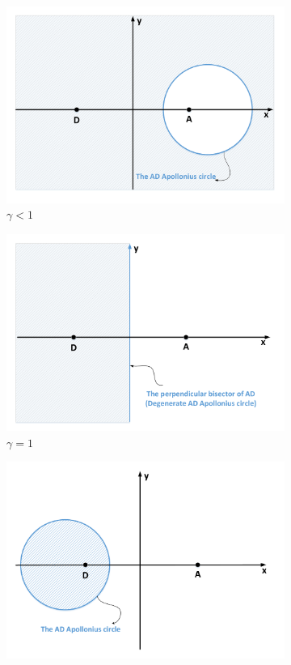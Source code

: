 \documentclass[final,5p,times,twocolumn]{elsarticle}
\begin{document}
\begin{figure}
\centering
\begin{subfigure}[htb]{0.3\textwidth}
\includegraphics[width=\columnwidth]{drawing4_1a.pdf}
\caption {$\gamma<1$}
\label{2_g<1}
\end{subfigure}
\quad
\begin{subfigure}[htb]{0.3\textwidth}
\includegraphics[width=\columnwidth]{drawing4_1b.pdf}
\caption {$\gamma=1$}
\label{2_g=1}
\end{subfigure}
\quad
\begin{subfigure}[htb]{0.3\textwidth}
\includegraphics[width=\columnwidth]{drawing4_1c.pdf}

\end{subfigure}
\end{figure}
\end{document}
